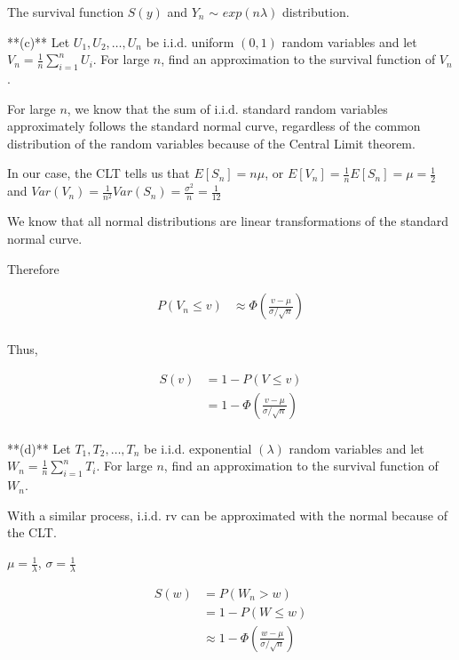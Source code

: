 \documentclass{report}
\begin{document}
The survival function $ S(y) $  and $ Y_{n} $ $ \sim $  $ exp(n\lambda) $ distribution. 

**(c)** Let $U_1, U_2, \ldots, U_n$ be i.i.d. uniform $(0, 1)$ random variables and let $V_n = \frac{1}{n} \sum_{i=1}^n U_i$. For large $n$, find an approximation to the survival function of $V_n$.

For large $ n $, we know that the sum of i.i.d. standard random variables approximately follows the standard normal curve, regardless of the common distribution of the random variables because of the Central Limit theorem.

In our case, the CLT tells us that 
$ E[S_{n}] = n\mu  $, or $ E[V_{n}] = \frac{1}{n} E[S_{n}] = \mu  = \frac{1}{2} $  and $ Var(V_{n}) = \frac{1}{n^{2}} Var(S_{n}) = \frac{\sigma^{2}}{n} = \frac{1}{12} $ 

We know that all normal distributions are linear transformations of the standard normal curve. 

Therefore 

\begin{align*}
	P(V_{n} \le v)&\approx \Phi(\frac{v-\mu }{\sigma / \sqrt{n}}) \\
\end{align*}

Thus, 

\begin{align*}
S(v) &= 1- P(V \le v) \\	
     &= 1 - \Phi(\frac{v-\mu }{\sigma / \sqrt{n}}) \\
\end{align*}

**(d)** Let $T_1, T_2, \ldots, T_n$ be i.i.d. exponential $(\lambda)$ random variables and let $W_n = \frac{1}{n} \sum_{i=1}^n T_i$. For large $n$, find an approximation to the survival function of $W_n$.

With a similar process, i.i.d. rv can be approximated with the normal because of the CLT. 

$ \mu = \frac{1}{\lambda} $, $ \sigma = \frac{1}{\lambda} $ 


\begin{align*}
	S(w) &= P(W_{n} > w) \\
	     &=1 - P(W \le w) \\
	     &\approx 1 - \Phi(\frac{w - \mu }{\sigma / \sqrt{n}})
\end{align*}

\section{}
\end{document}
